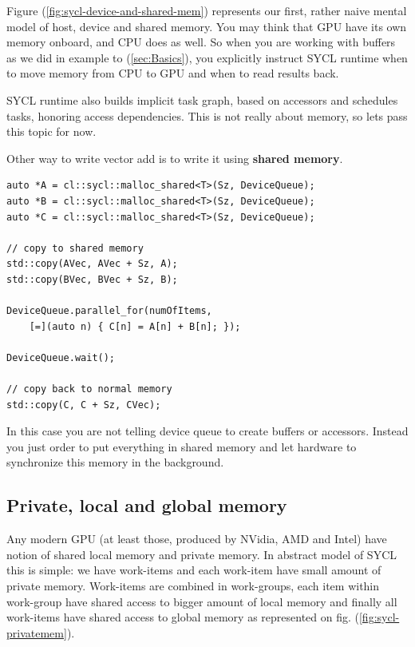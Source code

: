 \documentclass[a4paper,12pt,oneside]{article}
\begin{document}
Figure (\ref{fig:sycl-device-and-shared-mem}) represents our first, rather naive mental model of host, device and shared memory. You may think that GPU have its own memory onboard, and CPU does as well. So when you are working with buffers as we did in example to (\ref{sec:Basics}), you explicitly instruct SYCL runtime when to move memory from CPU to GPU and when to read results back.

SYCL runtime also builds implicit task graph, based on accessors and schedules tasks, honoring access dependencies. This is not really about memory, so lets pass this topic for now.

Other way to write vector add is to write it using \textbf{shared memory}.

\begin{lstlisting}[caption={Vector addition in shared memory},label={lst:vectoraddshared}]
auto *A = cl::sycl::malloc_shared<T>(Sz, DeviceQueue);
auto *B = cl::sycl::malloc_shared<T>(Sz, DeviceQueue);
auto *C = cl::sycl::malloc_shared<T>(Sz, DeviceQueue);

// copy to shared memory
std::copy(AVec, AVec + Sz, A);
std::copy(BVec, BVec + Sz, B);

DeviceQueue.parallel_for(numOfItems,
    [=](auto n) { C[n] = A[n] + B[n]; });

DeviceQueue.wait();

// copy back to normal memory
std::copy(C, C + Sz, CVec);
\end{lstlisting}

In this case you are not telling device queue to create buffers or accessors. Instead you just order to put everything in shared memory and let hardware to synchronize this memory in the background.


\subsection{Private, local and global memory}\label{subsec:PrivLocal}


Any modern GPU (at least those, produced by NVidia, AMD and Intel) have notion of shared local memory and private memory. In abstract model of SYCL this is simple: we have work-items and each work-item have small amount of private memory. Work-items are combined in work-groups, each item within work-group have shared access to bigger amount of local memory and finally all work-items have shared access to global memory as represented on fig. (\ref{fig:sycl-privatemem}).
\end{document}
